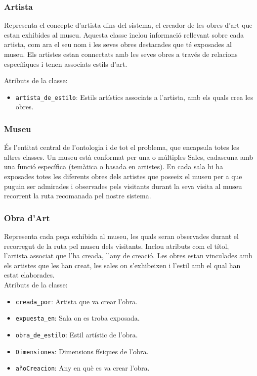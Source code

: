 \documentclass[a4paper]{article}
\begin{document}
	\subsubsection*{Artista}
	Representa el concepte d'artista dins del sistema, el creador de les obres d'art que estan exhibides al museu. Aquesta classe inclou informació rellevant sobre cada artista, com ara el seu nom i les seves obres destacades que té exposades al museu. Els artistes estan connectats amb les seves obres a través de relacions específiques i tenen associats estils d'art.
	
	Atributs de la classe:
	\begin{itemize}
		\item \texttt{artista\_de\_estilo}: Estils artístics associats a l’artista, amb els quals crea les obres.
	\end{itemize}
	
	
	\subsubsection*{Museu}
	És l'entitat central de l'ontologia i de tot el problema, que encapsula totes les altres classes. Un museu està conformat per una o múltiples Sales, cadascuna amb una funció específica (temàtica o basada en artistes). En cada sala hi ha exposades totes les diferents obres dels artistes que poseeix el museu per a que puguin ser admirades i observades pels visitants durant la seva visita al museu recorrent la ruta recomanada pel nostre sistema.
	
	\subsubsection*{Obra d'Art}
	Representa cada peça exhibida al museu, les quals seran observades durant el recorregut de la ruta pel museu dels visitants. Inclou atributs com el títol, l'artista associat que l'ha creada, l'any de creació. Les obres estan vinculades amb els artistes que les han creat, les sales on s'exhibeixen i l'estil amb el qual han estat elaborades.\\
	Atributs de la classe:
	\begin{itemize}
		\item \texttt{creada\_por}: Artista que va crear l’obra.
		\item \texttt{expuesta\_en}: Sala on es troba exposada.
		\item \texttt{obra\_de\_estilo}: Estil artístic de l’obra.
		\item \texttt{Dimensiones}: Dimensions físiques de l’obra.
		\item \texttt{añoCreacion}: Any en què es va crear l’obra.
	\end{itemize}
		
\end{document}
